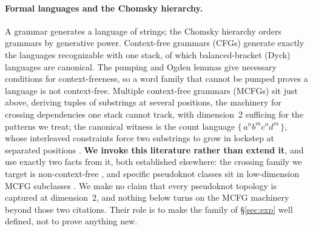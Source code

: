 \documentclass[11pt]{article}
\begin{document}
\paragraph{Formal languages and the Chomsky hierarchy.} A grammar generates a language of strings; the
Chomsky hierarchy \citep{chomsky1956,hopcroftullman1979} orders grammars by generative power. Context-free
grammars (CFGs) generate exactly the languages recognizable with one stack, of which balanced-bracket (Dyck)
languages are canonical. The pumping and Ogden lemmas \citep{ogden1968,hopcroftullman1979} give necessary
conditions for context-freeness, so a word family that cannot be pumped proves a language is not context-free.
Multiple context-free grammars (MCFGs) \citep{seki1991mcfg} sit just above, deriving tuples of substrings at
several positions, the machinery for crossing dependencies one stack cannot track, with dimension~2
sufficing for the patterns we treat; the canonical witness is the count language
$\{\,a^{n}b^{m}c^{n}d^{m}\,\}$, whose interleaved constraints force two substrings to grow in lockstep at
separated positions \citep{hopcroftullman1979}. \textbf{We invoke this literature rather than extend it}, and
use exactly two facts from it, both established elsewhere: the crossing family we target is non-context-free
\citep{nebelweinberg}, and specific pseudoknot classes sit in low-dimension MCFG subclasses
\citep{katosekikasami2006}. We make no claim that every pseudoknot topology is captured at dimension~2, and
nothing below turns on the MCFG machinery beyond those two citations. Their role is to make the family of
\S\ref{sec:exp} well defined, not to prove anything new.
\end{document}
